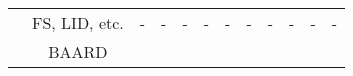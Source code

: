 \documentclass[varwidth=\maxdimen]{standalone}
\begin{document}
\begin{table}
\begin{tabular}{c|c|ccccc|ccccc}
                                                   & FS, LID, etc.                                         & -                                & -                                 & -                       & -                           & -                         & -                       & -                & -                 & -                & -                 \\
                                                   & BAARD                                                 &                                  &                                   &                         &                             &                           &                         &                  &                   &                  &                   \\
        \bottomrule
    \end{tabular}
\end{table}
\end{document}
